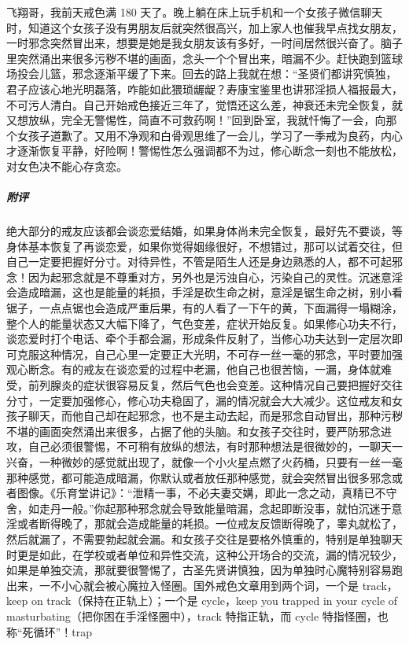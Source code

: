 \begin{case}
    飞翔哥，我前天戒色满 180 天了。晚上躺在床上玩手机和一个女孩子微信聊天时，知道这个女孩子没有男朋友后就突然很高兴，加上家人也催我早点找女朋友，一时邪念突然冒出来，想要是她是我女朋友该有多好，一时间居然很兴奋了。脑子里突然涌出来很多污秽不堪的画面，念头一个个冒出来，暗漏不少。赶快跑到篮球场投会儿篮，邪念逐渐平缓了下来。回去的路上我就在想：“圣贤们都讲究慎独，君子应该心地光明磊落，咋能如此猥琐龌龊？寿康宝鉴里也讲邪淫损人福报最大，不可污人清白。自己开始戒色接近三年了，觉悟还这么差，神衰还未完全恢复，就又想放纵，完全无警惕性，简直不可救药啊！”回到卧室，我就忏悔了一会，向那个女孩子道歉了。又用不净观和白骨观思维了一会儿，学习了一季戒为良药，内心才逐渐恢复平静，好险啊！警惕性怎么强调都不为过，修心断念一刻也不能放松，对女色决不能心存贪恋。
    \subparagraph{附评} 绝大部分的戒友应该都会谈恋爱结婚，如果身体尚未完全恢复，最好先不要谈，等身体基本恢复了再谈恋爱，如果你觉得姻缘很好，不想错过，那可以试着交往，但自己一定要把握好分寸。对待异性，不管是陌生人还是身边熟悉的人，都不可起邪念！因为起邪念就是不尊重对方，另外也是污浊自心，污染自己的灵性。沉迷意淫会造成暗漏，这也是能量的耗损，手淫是砍生命之树，意淫是锯生命之树，别小看锯子，一点点锯也会造成严重后果，有的人看了一下午的黄，下面漏得一塌糊涂，整个人的能量状态又大幅下降了，气色变差，症状开始反复。如果修心功夫不行，谈恋爱时打个电话、牵个手都会漏，形成条件反射了，当修心功夫达到一定层次即可克服这种情况，自己心里一定要正大光明，不可存一丝一毫的邪念，平时要加强观心断念。有的戒友在谈恋爱的过程中老漏，他自己也很苦恼，一漏，身体就难受，前列腺炎的症状很容易反复，然后气色也会变差。这种情况自己要把握好交往分寸，一定要加强修心，修心功夫稳固了，漏的情况就会大大减少。这位戒友和女孩子聊天，而他自己却在起邪念，也不是主动去起，而是邪念自动冒出，那种污秽不堪的画面突然涌出来很多，占据了他的头脑。和女孩子交往时，要严防邪念进攻，自己必须很警惕，不可稍有放纵的想法，有时那种想法是很微妙的，一聊天一兴奋，一种微妙的感觉就出现了，就像一个小火星点燃了火药桶，只要有一丝一毫那种感觉，都可能造成暗漏，你默认或者放任那种感觉，就会突然冒出很多邪念或者图像。《乐育堂讲记》：“泄精一事，不必夫妻交媾，即此一念之动，真精已不守舍，如走丹一般。”你起那种邪念就会导致能量暗漏，念起即断没事，就怕沉迷于意淫或者断得晚了，那就会造成能量的耗损。一位戒友反馈断得晚了，睾丸就松了，然后就漏了，不需要勃起就会漏。和女孩子交往是要格外慎重的，特别是单独聊天时更是如此，在学校或者单位和异性交流，这种公开场合的交流，漏的情况较少，如果是单独交流，那就要很警惕了，古圣先贤讲慎独，因为单独时心魔特别容易跑出来，一不小心就会被心魔拉入怪圈。国外戒色文章用到两个词，一个是 track，keep on track（保持在正轨上）；一个是 cycle，keep you trapped in your cycle of masturbating（把你困在手淫怪圈中），track 特指正轨，而 cycle 特指怪圈，也称“死循环”！trap 
\end{case}
